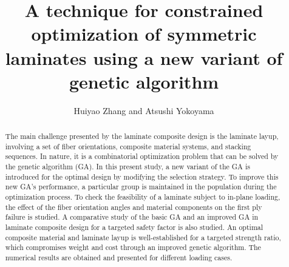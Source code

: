 \documentclass[Afour,sagev,times]{sagej}
\begin{document}

\title{A technique for constrained optimization of symmetric laminates using a new variant of genetic algorithm}

\author{Huiyao Zhang and Atsushi Yokoyama}




\begin{abstract}
The main challenge presented by the laminate composite design is the laminate layup, involving a
set of fiber orientations, composite material systems, and stacking sequences. In nature, it is a
combinatorial optimization problem that can be solved by the genetic algorithm (GA). In this present
study, a new variant of the GA is introduced for the optimal design by modifying the selection
strategy. To improve this new GA's performance, a particular group is maintained in the population
during the optimization process. To check the feasibility of a laminate subject to in-plane
loading, the effect of the fiber orientation angles and material components on the first ply failure is
studied. A comparative study of the basic GA and an improved GA in laminate composite design for a
targeted safety factor is also studied. An optimal composite material and laminate layup is
well-established for a targeted strength ratio, which compromises weight and cost through an improved
genetic algorithm. The numerical results are obtained and presented for different loading cases.
\end{abstract}


\maketitle
\end{document}
